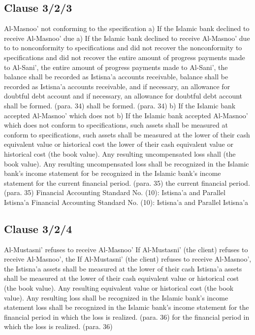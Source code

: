 \documentclass{article}%
\begin{document}
\subsection{Clause 3/2/3}%
\label{subsec:Clause3/2/3}%
Al-Masnoo’ not conforming to the specification a) If the Islamic bank declined to receive Al-Masnoo’ due  a) If the Islamic bank declined to receive Al-Masnoo’ due  to  to nonconformity to specifications and did not recover the  nonconformity to specifications and did not recover the  entire amount of progress payments made to Al-Sani’, the  entire amount of progress payments made to Al-Sani’, the  balance shall be recorded as Istisna’a accounts receivable,  balance shall be recorded as Istisna’a accounts receivable,  and if necessary, an allowance for doubtful debt account  and if necessary, an allowance for doubtful debt account  shall be formed. (para. 34) shall be formed. (para. 34) b) If the Islamic bank accepted Al-Masnoo’ which does not  b) If the Islamic bank accepted Al-Masnoo’ which does not  conform to specifications, such assets shall be measured at  conform to specifications, such assets shall be measured at  the lower of their cash equivalent value or historical cost  the lower of their cash equivalent value or historical cost  (the book value). Any resulting uncompensated loss shall  (the book value). Any resulting uncompensated loss shall  be recognized in the Islamic bank’s income statement for  be recognized in the Islamic bank’s income statement for  the current financial period. (para. 35) the current financial period. (para. 35) Financial Accounting Standard No. (10): Istisna’a and Parallel Istisna’a Financial Accounting Standard No. (10): Istisna’a and Parallel Istisna’a

%
\subsection{Clause 3/2/4}%
\label{subsec:Clause3/2/4}%
Al-Mustasni’ refuses to receive Al-Masnoo’   If Al-Mustasni’ (the client) refuses to receive Al-Masnoo’, the    If Al-Mustasni’ (the client) refuses to receive Al-Masnoo’, the  Istisna’a assets shall be measured at the lower of their cash  Istisna’a assets shall be measured at the lower of their cash  equivalent value or historical cost (the book value). Any resulting  equivalent value or historical cost (the book value). Any resulting  loss shall be recognized in the Islamic bank’s income statement  loss shall be recognized in the Islamic bank’s income statement  for the financial period in which the loss is realized. (para. 36) for the financial period in which the loss is realized. (para. 36)
\end{document}
